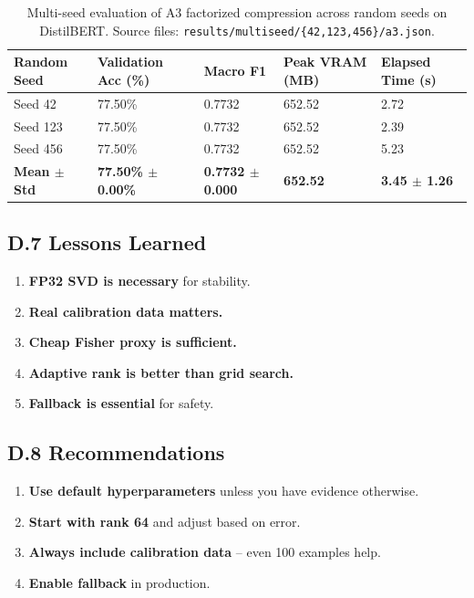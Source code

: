 \begin{table}[H]
\centering
\small
\begin{tabular}{lllll}
\toprule
\textbf{Random Seed} & \textbf{Validation Acc (\%)} & \textbf{Macro F1} & \textbf{Peak VRAM (MB)} & \textbf{Elapsed Time (s)} \\
\midrule
Seed 42  & 77.50\% & 0.7732 & 652.52 & 2.72 \\
Seed 123 & 77.50\% & 0.7732 & 652.52 & 2.39 \\
Seed 456 & 77.50\% & 0.7732 & 652.52 & 5.23 \\
\midrule
\textbf{Mean $\pm$ Std} & \textbf{77.50\% $\pm$ 0.00\%} & \textbf{0.7732 $\pm$ 0.000} & \textbf{652.52} & \textbf{3.45 $\pm$ 1.26} \\
\bottomrule
\end{tabular}
\caption{Multi-seed evaluation of A3 factorized compression across random seeds on DistilBERT. Source files: \texttt{results/multiseed/\{42,123,456\}/a3.json}.}
\label{tab:app\_multiseed\_eval}
\end{table}

\subsection{D.7 Lessons Learned}

\begin{enumerate}
\item \textbf{FP32 SVD is necessary} for stability.
\item \textbf{Real calibration data matters.}
\item \textbf{Cheap Fisher proxy is sufficient.}
\item \textbf{Adaptive rank is better than grid search.}
\item \textbf{Fallback is essential} for safety.
\end{enumerate}

\subsection{D.8 Recommendations}

\begin{enumerate}
\item \textbf{Use default hyperparameters} unless you have evidence otherwise.
\item \textbf{Start with rank 64} and adjust based on error.
\item \textbf{Always include calibration data} -- even 100 examples help.
\item \textbf{Enable fallback} in production.
\end{enumerate}

